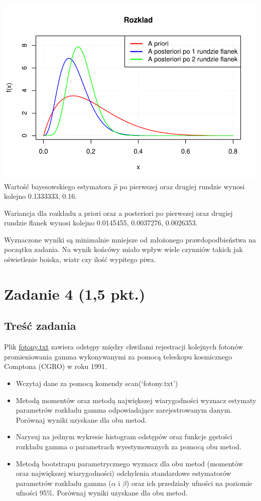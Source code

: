 \documentclass[
]{article}
\begin{document}
\includegraphics{ADPS_L2_files/figure-latex/unnamed-chunk-12-1.pdf}
Wartość bayesowskiego estymatora \(\hat{p}\) po pierwszej oraz drugiej
rundzie wynosi kolejno 0.1333333, 0.16.

Wariancja dla rozkładu a priori oraz a posteriori po pierwszej oraz
drugiej rundzie flanek wynosi kolejno 0.0145455, 0.0037276, 0.0026353.

Wyznaczone wyniki są minimalnie mniejsze od założonego prawdopodbieństwa
na początku zadania. Na wynik końcówy miało wpływ wiele czynniów takich
jak oświetlenie boiska, wiatr czy ilość wypitego piwa.

\hypertarget{zadanie-4-15-pkt.}{%
\section{Zadanie 4 (1,5 pkt.)}\label{zadanie-4-15-pkt.}}

\hypertarget{treux15bux107-zadania-3}{%
\subsection{Treść zadania}\label{treux15bux107-zadania-3}}

Plik
\href{http://elektron.elka.pw.edu.pl/~mrupniew/adps/fotony.txt}{fotony.txt}
zawiera odstępy między chwilami rejestracji kolejnych fotonów
promieniowania gamma wykonywanymi za pomocą teleskopu kosmicznego
Comptona (CGRO) w roku 1991.

\begin{itemize}
\item
  Wczytaj dane za pomocą komendy scan(`fotony.txt')
\item
  Metodą momentów oraz metodą największej wiarygodności wyznacz estymaty
  parametrów rozkładu gamma odpowiadające zarejestrowanym danym.
  Porównaj wyniki uzyskane dla obu metod.
\item
  Narysuj na jednym wykresie histogram odstępów oraz funkcje gęstości
  rozkładu gamma o parametrach wyestymowanych za pomocą obu metod.
\item
  Metodą bootstrapu parametrycznego wyznacz dla obu metod (momentów oraz
  największej wiarygodności) odchylenia standardowe estymatorów
  parametrów rozkładu gamma (\(\alpha\) i \(\beta\)) oraz ich przedziały
  ufności na poziomie ufności 95\%. Porównaj wyniki uzyskane dla obu
  metod.
\end{itemize}
\end{document}
